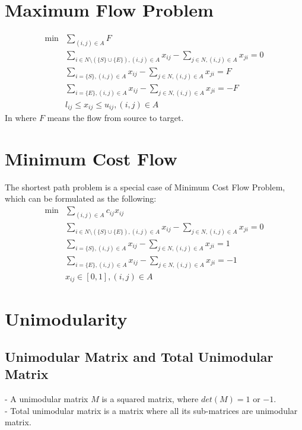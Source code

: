 			\section{Maximum Flow Problem}
				\begin{align}
					\min &\sum_{(i, j)\in A} F \\
					& \sum_{i \in N\setminus(\{S\}\cup\{E\}), (i,j)\in A} x_{ij} - \sum_{j \in N, (i,j)\in A} x_{ji} = 0 \\
					& \sum_{i=\{S\}, (i,j)\in A} x_{ij} - \sum_{j \in N, (i,j)\in A} x_{ji} = F \\
					& \sum_{i=\{E\}, (i,j)\in A} x_{ij} - \sum_{j \in N, (i,j)\in A} x_{ji} = -F \\
					& l_{ij} \le x_{ij} \le u_{ij}, (i,j)\in A 
				\end{align}
				In where $F$ means the flow from source to target.

			\section{Minimum Cost Flow}
				The shortest path problem is a special case of Minimum Cost Flow Problem, which can be formulated as the following:\\
				\begin{align}
					\min &\sum_{(i, j)\in A} c_{ij}x_{ij} \\
					& \sum_{i \in N\setminus(\{S\}\cup\{E\}), (i,j)\in A} x_{ij} - \sum_{j \in N, (i,j)\in A} x_{ji} = 0 \\
					& \sum_{i=\{S\}, (i,j)\in A} x_{ij} - \sum_{j \in N, (i,j)\in A} x_{ji} = 1 \\
					& \sum_{i=\{E\}, (i,j)\in A} x_{ij} - \sum_{j \in N, (i,j)\in A} x_{ji} = -1 \\
					& x_{ij} \in [0,1], (i,j)\in A 
				\end{align}

			\section{Unimodularity}
				\subsection{Unimodular Matrix and Total Unimodular Matrix}
					- A unimodular matrix $M$ is a squared matrix, where $det(M)=1$ or $-1$.\\
					- Total unimodular matrix is a matrix where all its sub-matrices are unimodular matrix.

